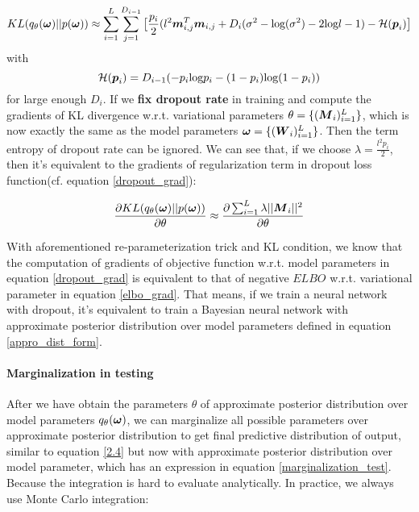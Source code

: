 \begin{equation}
\begin{aligned} \label{kl_condition}
KL(q_{\theta}(\boldsymbol \omega) || p(\boldsymbol \omega)) \approx \sum_{i=1}^{L} \sum_{j=1}^{D_{i-1}}
\big[
\frac{p_{i}}{2}(l^{2}\boldsymbol m_{i,j}^{T} \boldsymbol m_{i,j} + D_{i}( \sigma^{2} -\text{log}(\sigma^{2}) -2\text{log} l- 1) - \mathcal H (\boldsymbol p_{i}) 
\big] 
\end{aligned} 
\end{equation}
with 
\[
\mathcal H(\boldsymbol p_{i}) = D_{i-1}(-p_{i}\text{log}p_{i} - (1-p_{i})\text{log}(1-p_{i}))
\]
for large enough $D_{i}$. If we \textbf{fix dropout rate} in training and compute the gradients of KL divergence w.r.t. variational parameters $\theta = \{(\boldsymbol M_{i})_{i=1}^{L} \}$, which is now exactly the same as the model parameters $\boldsymbol \omega = \{(\boldsymbol W_i)_{i=1}^L\}$. Then the term entropy of dropout rate can be ignored.  We can see that, if we choose $\lambda = \frac{l^{2}p_{i}}{2}$, then it's equivalent to the gradients of regularization term in dropout loss function(cf. equation \ref{dropout_grad}):

\begin{equation} 
\begin{aligned}\label{KL_grad}
\frac{\partial KL(q_{\theta}(\boldsymbol \omega)||p(\boldsymbol \omega))}{\partial \theta} \approx \frac{\partial \sum_{i=1}^{L}\lambda||\boldsymbol M_{i}||^{2}}{\partial \theta}
\end{aligned}
\end{equation}

With aforementioned re-parameterization trick and KL condition, we know that the computation of gradients of objective function w.r.t. model parameters in equation \ref{dropout_grad} is equivalent to that of negative $ELBO$ w.r.t. variational parameter in equation \ref{elbo_grad}. That means, if we train a neural network with dropout, it's equivalent to train a Bayesian neural network with approximate posterior distribution over model parameters defined in equation \ref{appro_dist_form}.

\paragraph{Marginalization in testing}
After we have obtain the parameters $\theta$ of approximate posterior distribution over model parameters $q_{\theta}(\boldsymbol \omega)$, we can marginalize all possible parameters over approximate posterior distribution to get final predictive distribution of output, similar to equation \ref{2.4} but now with approximate posterior distribution over model parameter, which has an expression in equation \ref{marginalization_test}. Because the integration is hard to evaluate analytically. In practice, we always use Monte Carlo integration:

